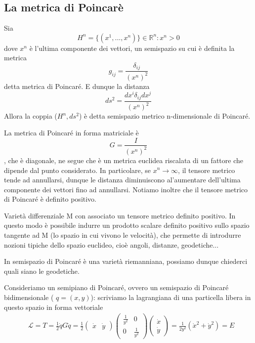 \documentclass[
10pt, %
a4paper, %
oneside, %
headinclude,footinclude, %
BCOR5mm, %
]{scrartcl}
\begin{document}
\subsection{La metrica di Poincarè}
\begin{definizione}
	Sia 
	\[H^n = \{(x^1, ..., x^n)\}\in\mathbb{R}^n: x^n>0 \]
	dove \(x^n\) è l'ultima componente dei vettori, un semispazio su cui è definita la metrica
	\[g_{ij} = \frac{\delta_{ij}}{(x^n)^2}\]
	detta metrica di Poincaré. E dunque la distanza
	\[ds^2 = \frac{dx^i\delta_{ij}dx^j}{(x^n)^2}\] 
	 Allora la coppia (\(H^n, ds^2\)) è detta semispazio metrico n-dimensionale di Poincaré.
\end{definizione}	
\begin{osservazione}
	La metrica di Poincaré in forma matriciale è\[G = \frac{I}{(x^n)^2}\], che è diagonale, ne segue che è un metrica euclidea riscalata di un fattore che dipende dal punto considerato. In particolare, se \(x^n \rightarrow \infty\), il tensore metrico tende ad annullarsi, dunque le distanza diminuiscono al'aumentare dell'ultima componente dei vettori fino ad annullarsi. Notiamo inoltre che il tensore metrico di Poincaré è definito positivo. 
\end{osservazione}
\begin{definizione}
	Varietà differenziale M con associato un tensore metrico definito positivo. In questo modo è possibile indurre un prodotto scalare definito positivo sullo spazio tangente ad M (lo spazio in cui vivono le velocità), che permette di introdurre nozioni tipiche dello spazio euclideo, cioè angoli, distanze, geodetiche...
\end{definizione}
\begin{osservazione}
	In semispazio di Poincaré è una varietà riemanniana, possiamo dunque chiederci quali siano le geodetiche.
\end{osservazione}
Consideriamo un semipiano di Poincaré, ovvero un semispazio di Poincaré bidimensionale ( \(q = (x, y)\)): scriviamo la lagrangiana di una particella libera in questo spazio in forma vettoriale
\begin{align*}
	&\mathcal{L} = T = \frac{1}{2}\dot{q} G \dot{q} =
	 \frac{1}{2}
	 \begin{pmatrix}
	 	\dot{x}&\dot{y}
	 \end{pmatrix}
 \begin{pmatrix}
 	\frac{1}{y^2}&0\\
 	0&\frac{1}{y^2}
 \end{pmatrix}
\begin{pmatrix}
	\dot{x}\\
	\dot{y}
\end{pmatrix}= \frac{1}{2y^2}(\dot{x}^2+\dot{y}^2) = E
\end{align*}
\end{document}
